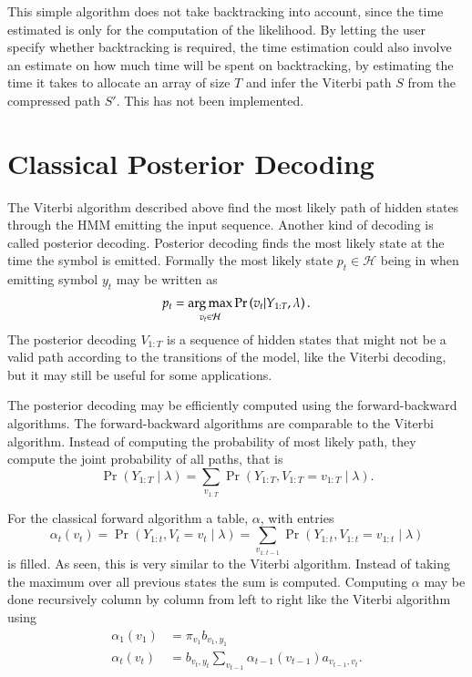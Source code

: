 This simple algorithm does not take backtracking into account, since the time
estimated is only for the computation of the likelihood. By letting the user
specify whether backtracking is required, the time estimation could also
involve an estimate on how much time will be spent on backtracking, by
estimating the time it takes to allocate an array of size $T$ and
infer the Viterbi path $S$ from the compressed path $S'$. This has
not been implemented.

\section{Classical Posterior Decoding}
\label{sec:posterior-decoding-1}

The Viterbi algorithm described above find the most likely path of hidden
states through the HMM emitting the input sequence. Another kind of decoding is
called posterior decoding. Posterior decoding finds the most likely state at
the time the symbol is emitted. Formally the most likely state
$p_t \in \mathcal{H}$ being in when emitting symbol $y_t$ may be written as
\begin{equation*}
  p_t = \operatorname*{arg\,max}_{v_t \in \mathcal{H}} \Pr \left(v_t | Y_{1:T}, \lambda \right).
\end{equation*}
The posterior decoding $V_{1:T}$ is a sequence of hidden states that might not
be a valid path according to the transitions of the model, like the Viterbi
decoding, but it may still be useful for some applications.

The posterior decoding may be efficiently computed using the forward-backward
algorithms. The forward-backward algorithms are comparable to the Viterbi
algorithm. Instead of computing the probability of most likely path, they
compute the joint probability of all paths, that is
\begin{equation*}
  \Pr
  \left(
    Y_{1:T} \mid \lambda
  \right) = \sum_{v_{1:T}} \Pr
  \left(
    Y_{1:T}, V_{1:T} = v_{1:T} \mid \lambda
  \right).
\end{equation*}

For the classical forward algorithm a table, $\alpha$, with entries
\begin{equation*}
\alpha_t(v_t) = \Pr \left( Y_{1:t}, V_t = v_t \mid \lambda \right) =
\sum_{v_{1:t-1}} \Pr \left( Y_{1:t}, V_{1:t} = v_{1:t} \mid \lambda \right)
\end{equation*}
is filled. As seen, this is very similar to the Viterbi algorithm. Instead of
taking the maximum over all previous states the sum is computed. Computing
$\alpha$ may be done recursively column by column from left to right like the
Viterbi algorithm using
\begin{equation}
  \label{eq:8}
  \begin{aligned}
    \alpha_1(v_1) &= \pi_{v_1} b_{v_1, y_1} \\
    \alpha_t(v_t) &= b_{v_t, y_t} \sum_{v_{t - 1}} \alpha_{t - 1}(v_{t - 1})
    a_{v_{t - 1}, v_t}.
  \end{aligned}
\end{equation}

